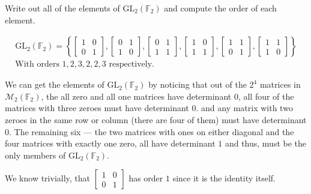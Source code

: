\documentclass[12 pt, letterpaper]{hmcpset}
\begin{document}
\begin{problem}
	Write out all of the elements of $\mathrm{GL}_2(\mathbb F_2)$ and compute the order of each element.
\end{problem}

\begin{solution}
	\[
		\boxed{
			\begin{gathered}
				\mathrm{GL}_2(\mathbb F_2) = \left \{ \begin{bmatrix}
					1 & 0 \\
					0 & 1
				\end{bmatrix},
				\begin{bmatrix}
					0 & 1 \\
					1 & 0
				\end{bmatrix},
				\begin{bmatrix}
					0 & 1 \\
					1 & 1
				\end{bmatrix},
				\begin{bmatrix}
					1 & 0 \\
					1 & 1
				\end{bmatrix},
				\begin{bmatrix}
					1 & 1 \\
					0 & 1
				\end{bmatrix},
					\begin{bmatrix}
					1 & 1 \\
					1 & 0
			\end{bmatrix} \right \} \\
			\text{With orders } 1, 2, 3, 2, 2, 3 \text{ respectively.}
			\end{gathered}
		}
	\] 

	We can get the elements of $\mathrm{GL}_2(\mathbb F_2)$ by noticing that out of the $2^4$ matrices in $\mathcal M_2(\mathbb F_2)$, the all zero and all one matrices have determinant $0$, all four of the matrices with three zeroes must have determinant $0$. and any matrix with two zeroes in the same row or column (there are four of them) must have determinant $0$. The remaining six --- the two matrices with ones on either diagonal and the four matrices with exactly one zero, all have determinant $1$ and thus, must be the only members of $\mathrm{GL}_2(\mathbb F_2)$. 

	We know trivially, that $\begin{bmatrix}
		1 & 0 \\
		0 & 1
	\end{bmatrix}$ has order $1$ since it is the identity itself.


\end{solution}
\end{document}
